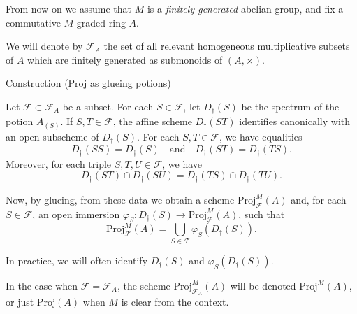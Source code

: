 \documentclass[9pt]{beamer}
\begin{document}
\begin{frame}


From now on we assume that $M$ is a \emph{finitely generated} abelian group, and fix a commutative $M$-graded ring $A$.

We will denote by $\mathcal{F}_A$ the set of all relevant homogeneous multiplicative subsets of $A$ which are finitely generated as submonoids of $(A,\times)$.

\begin{block}{Construction (Proj as glueing potions)}

Let
$\mathcal{F} \subset \mathcal{F}_A$ be a subset.
 For each $S \in \mathcal{F}$, let $D_{\dagger}(S)$ be the spectrum of the potion $A_{(S)}$. 
 If $S,T \in \mathcal{F}$, the affine scheme $D_{\dagger}(ST)$ identifies canonically with an open subscheme of $D_{\dagger}(S)$. For each $S,T \in \mathcal{F}$, we have equalities
 \[
 D_{\dagger}({S S}) = D_{\dagger}(S) \quad \text{and} \quad D_{\dagger}({ST})=D_{\dagger}({TS}).
 \]
 Moreover, for each triple $S,T,U \in \mathcal{F}$, we have
 \[
 D_{\dagger}({ST} )\cap D_{\dagger}({SU}) = D_{\dagger}({TS}) \cap D_{\dagger}({TU}).
 \]

Now, by glueing, from these data we obtain a scheme $\mathrm{Proj}^M_{\mathcal{F} } (A)$ and, for each $S \in \mathcal{F}$, an open immersion $\varphi_S : D_{\dagger}(S) \to \mathrm{Proj}^M_{\mathcal{F}} (A)$, such that
\[
\mathrm{Proj}^M_{\mathcal{F} } (A) = \bigcup_{S \in \mathcal{F} } \varphi_S( D_{\dagger}(S)).
\]

In practice, we will often identify $D_{\dagger}(S) $ and $\varphi_S (D_{\dagger}(S))$. 


In the case when $\mathcal{F} = \mathcal{F}_A$,
 the scheme $\mathrm{Proj}^M_{\mathcal{F}_A} (A)$ will be denoted $\mathrm{Proj}^M(A)$, or just $\mathrm{Proj}( A)$ when $M$ is clear from the context.
 \end{block}

 \end{frame}
\end{document}
